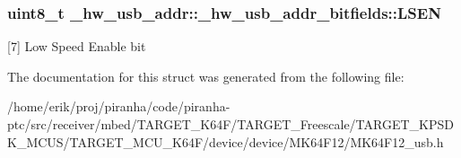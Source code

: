 \subsubsection[{\texorpdfstring{L\+S\+EN}{LSEN}}]{\setlength{\rightskip}{0pt plus 5cm}uint8\+\_\+t \+\_\+hw\+\_\+usb\+\_\+addr\+::\+\_\+hw\+\_\+usb\+\_\+addr\+\_\+bitfields\+::\+L\+S\+EN}\hypertarget{struct__hw__usb__addr_1_1__hw__usb__addr__bitfields_ad148f07642d2ee0da856de1df4f55305}{}\label{struct__hw__usb__addr_1_1__hw__usb__addr__bitfields_ad148f07642d2ee0da856de1df4f55305}
\mbox{[}7\mbox{]} Low Speed Enable bit 

The documentation for this struct was generated from the following file\+:\begin{DoxyCompactItemize}
\item 
/home/erik/proj/piranha/code/piranha-\/ptc/src/receiver/mbed/\+T\+A\+R\+G\+E\+T\+\_\+\+K64\+F/\+T\+A\+R\+G\+E\+T\+\_\+\+Freescale/\+T\+A\+R\+G\+E\+T\+\_\+\+K\+P\+S\+D\+K\+\_\+\+M\+C\+U\+S/\+T\+A\+R\+G\+E\+T\+\_\+\+M\+C\+U\+\_\+\+K64\+F/device/device/\+M\+K64\+F12/M\+K64\+F12\+\_\+usb.\+h\end{DoxyCompactItemize}
